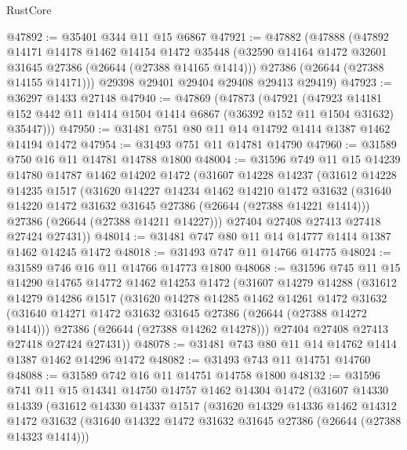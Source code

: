 \begin{lexlean}{RustCore}
\begin{coremodule}
@47892 := @35401 @344 @11 @15 @6867
@47921 := @47882
    (@47888
      (@47892
        @14171
        @14178
        @1462
        @14154
        @1472
        @35448
        (@32590 @14164 @1472 @32601 @31645 @27386 (@26644 (@27388 @14165 @1414)))
        @27386
        (@26644 (@27388 @14155 @14171)))
      @29398
      @29401
      @29404
      @29408
      @29413
      @29419)
@47923 := @36297 @1433 @27148
@47940 := @47869
    (@47873
      (@47921
        (@47923
          @14181
          @152
          @442
          @11
          @1414
          @1504
          @1414
          @6867
          (@36392 @152 @11 @1504 @31632)
          @35447)))
@47950 := @31481 @751 @80 @11 @14 @14792 @1414 @1387 @1462 @14194 @1472
@47954 := @31493 @751 @11 @14781 @14790
@47960 := @31589 @750 @16 @11 @14781 @14788 @1800
@48004 := @31596
    @749
    @11
    @15
    @14239
    @14780
    @14787
    @1462
    @14202
    @1472
    (@31607
      @14228
      @14237
      (@31612
        @14228
        @14235
        @1517
        (@31620
          @14227
          @14234
          @1462
          @14210
          @1472
          @31632
          (@31640 @14220 @1472 @31632 @31645 @27386 (@26644 (@27388 @14221 @1414)))
          @27386
          (@26644 (@27388 @14211 @14227)))
        @27404
        @27408
        @27413
        @27418
        @27424
        @27431))
@48014 := @31481 @747 @80 @11 @14 @14777 @1414 @1387 @1462 @14245 @1472
@48018 := @31493 @747 @11 @14766 @14775
@48024 := @31589 @746 @16 @11 @14766 @14773 @1800
@48068 := @31596
    @745
    @11
    @15
    @14290
    @14765
    @14772
    @1462
    @14253
    @1472
    (@31607
      @14279
      @14288
      (@31612
        @14279
        @14286
        @1517
        (@31620
          @14278
          @14285
          @1462
          @14261
          @1472
          @31632
          (@31640 @14271 @1472 @31632 @31645 @27386 (@26644 (@27388 @14272 @1414)))
          @27386
          (@26644 (@27388 @14262 @14278)))
        @27404
        @27408
        @27413
        @27418
        @27424
        @27431))
@48078 := @31481 @743 @80 @11 @14 @14762 @1414 @1387 @1462 @14296 @1472
@48082 := @31493 @743 @11 @14751 @14760
@48088 := @31589 @742 @16 @11 @14751 @14758 @1800
@48132 := @31596
    @741
    @11
    @15
    @14341
    @14750
    @14757
    @1462
    @14304
    @1472
    (@31607
      @14330
      @14339
      (@31612
        @14330
        @14337
        @1517
        (@31620
          @14329
          @14336
          @1462
          @14312
          @1472
          @31632
          (@31640 @14322 @1472 @31632 @31645 @27386 (@26644 (@27388 @14323 @1414)))

\end{coremodule}
\end{lexlean}
